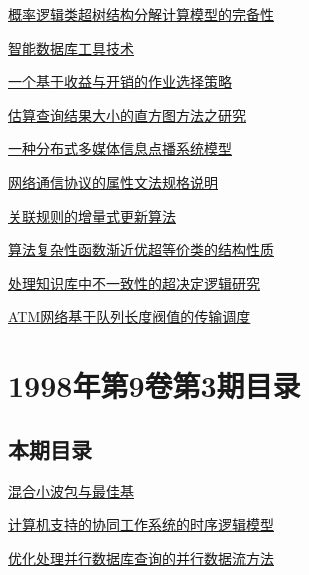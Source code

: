 \documentclass[a4paper]{article}
\begin{document}
\href{http://www.jos.org.cn/ch/reader/download_pdf.aspx?file_no=19980407&year_id=1998&quarter_id=4&falg=1}{概率逻辑类超树结构分解计算模型的完备性}

\href{http://www.jos.org.cn/ch/reader/download_pdf.aspx?file_no=19980408&year_id=1998&quarter_id=4&falg=1}{智能数据库工具技术}

\href{http://www.jos.org.cn/ch/reader/download_pdf.aspx?file_no=19980409&year_id=1998&quarter_id=4&falg=1}{一个基于收益与开销的作业选择策略}

\href{http://www.jos.org.cn/ch/reader/download_pdf.aspx?file_no=19980410&year_id=1998&quarter_id=4&falg=1}{估算查询结果大小的直方图方法之研究}

\href{http://www.jos.org.cn/ch/reader/download_pdf.aspx?file_no=19980411&year_id=1998&quarter_id=4&falg=1}{一种分布式多媒体信息点播系统模型}

\href{http://www.jos.org.cn/ch/reader/download_pdf.aspx?file_no=19980412&year_id=1998&quarter_id=4&falg=1}{网络通信协议的属性文法规格说明}

\href{http://www.jos.org.cn/ch/reader/download_pdf.aspx?file_no=19980413&year_id=1998&quarter_id=4&falg=1}{关联规则的增量式更新算法}

\href{http://www.jos.org.cn/ch/reader/download_pdf.aspx?file_no=19980414&year_id=1998&quarter_id=4&falg=1}{算法复杂性函数渐近优超等价类的结构性质}

\href{http://www.jos.org.cn/ch/reader/download_pdf.aspx?file_no=19980415&year_id=1998&quarter_id=4&falg=1}{处理知识库中不一致性的超决定逻辑研究}

\href{http://www.jos.org.cn/ch/reader/download_pdf.aspx?file_no=19980416&year_id=1998&quarter_id=4&falg=1}{ATM网络基于队列长度阀值的传输调度}


\section{\textbf{1998年第9卷第3期目录}}
\subsection{本期目录}
\href{http://www.jos.org.cn/ch/reader/download_pdf.aspx?file_no=19980301&year_id=1998&quarter_id=3&falg=1}{混合小波包与最佳基}

\href{http://www.jos.org.cn/ch/reader/download_pdf.aspx?file_no=19980302&year_id=1998&quarter_id=3&falg=1}{计算机支持的协同工作系统的时序逻辑模型}

\href{http://www.jos.org.cn/ch/reader/download_pdf.aspx?file_no=19980303&year_id=1998&quarter_id=3&falg=1}{优化处理并行数据库查询的并行数据流方法}
\end{document}
